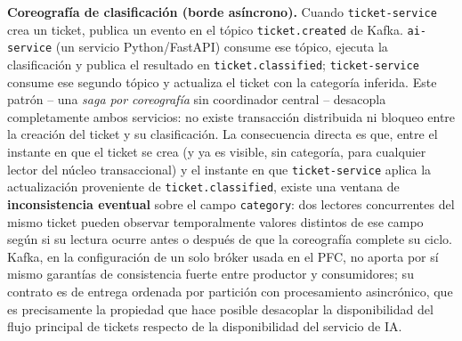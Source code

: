 \documentclass[11pt,a4paper]{article}
\begin{document}
\textbf{Coreograf\'ia de clasificaci\'on (borde as\'incrono).} Cuando \texttt{ticket-service} crea
un ticket, publica un evento en el t\'opico \texttt{ticket.created} de Kafka. \texttt{ai-service}
(un servicio Python/FastAPI) consume ese t\'opico, ejecuta la clasificaci\'on y publica el
resultado en \texttt{ticket.classified}; \texttt{ticket-service} consume ese segundo t\'opico y
actualiza el ticket con la categor\'ia inferida. Este patr\'on -- una \emph{saga por
coreograf\'ia} sin coordinador central -- desacopla completamente ambos servicios: no existe
transacci\'on distribuida ni bloqueo entre la creaci\'on del ticket y su clasificaci\'on. La
consecuencia directa es que, entre el instante en que el ticket se crea (y ya es visible, sin
categor\'ia, para cualquier lector del n\'ucleo transaccional) y el instante en que
\texttt{ticket-service} aplica la actualizaci\'on proveniente de \texttt{ticket.classified}, existe
una ventana de \textbf{inconsistencia eventual} sobre el campo \texttt{category}: dos lectores
concurrentes del mismo ticket pueden observar temporalmente valores distintos de ese campo seg\'un
si su lectura ocurre antes o despu\'es de que la coreograf\'ia complete su ciclo. Kafka, en la
configuraci\'on de un solo bróker usada en el PFC, no aporta por s\'i mismo garant\'ias de
consistencia fuerte entre productor y consumidores; su contrato es de entrega ordenada por
partici\'on con procesamiento asincr\'onico, que es precisamente la propiedad que hace posible
desacoplar la disponibilidad del flujo principal de tickets respecto de la disponibilidad del
servicio de IA.
\end{document}
